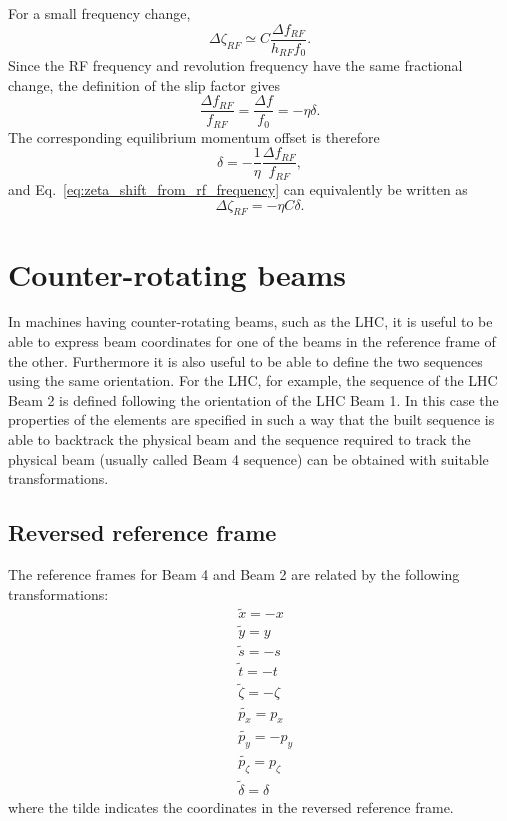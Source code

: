 For a small frequency change,
\begin{equation}
\Delta\zeta_{RF}
\simeq C\frac{\Delta f_{RF}}{h_{RF}f_0}.
\end{equation}
Since the RF frequency and revolution frequency have the same fractional change,
the definition of the slip factor gives
\begin{equation}
\frac{\Delta f_{RF}}{f_{RF}}
=\frac{\Delta f}{f_0}
=-\eta\delta.
\end{equation}
The corresponding equilibrium momentum offset is therefore
\begin{equation}
\boxed{
\delta=-\frac{1}{\eta}\frac{\Delta f_{RF}}{f_{RF}},}
\end{equation}
and Eq.~\ref{eq:zeta_shift_from_rf_frequency} can equivalently be written as
\begin{equation}
\Delta\zeta_{RF}=-\eta C\delta.
\end{equation}


\chapter{Counter-rotating beams}

In machines having counter-rotating beams, such as the LHC, it is useful to be able
to express beam coordinates for one of the beams in the reference frame of the other.
Furthermore it is also useful to be able to define the two sequences using the same
orientation. For the LHC, for example, the sequence of the LHC Beam 2 is defined
following the orientation of the LHC Beam 1. In this case the properties of the
elements are specified in such a way that the built sequence is able to backtrack
the physical beam and the sequence required to track the physical beam (usually called
Beam 4 sequence) can be obtained with suitable transformations.

\section{Reversed reference frame}
The reference frames for Beam 4 and Beam 2 are related by the following transformations:
\begin{align}
&\tilde{x} = -x \label{eq:rev_x}\\
&\tilde{y} = y \label{eq:rev_y}\\
&\tilde{s} = -s \label{eq:rev_s}\\
&\tilde{t} = -t \label{eq:rev_t}\\
&\tilde{\zeta} = -\zeta \label{eq:rev_zeta}\\
&\tilde{p_x} = p_x \label{eq:rev_px}\\
&\tilde{p_y} = -p_y \label{eq:rev_py}\\
&\tilde{p_\zeta} = p_\zeta \label{eq:rev_pzeta}\\
&\tilde{\delta} = \delta \label{eq:rev_delta}
\end{align}
where the tilde indicates the coordinates in the reversed reference frame.

